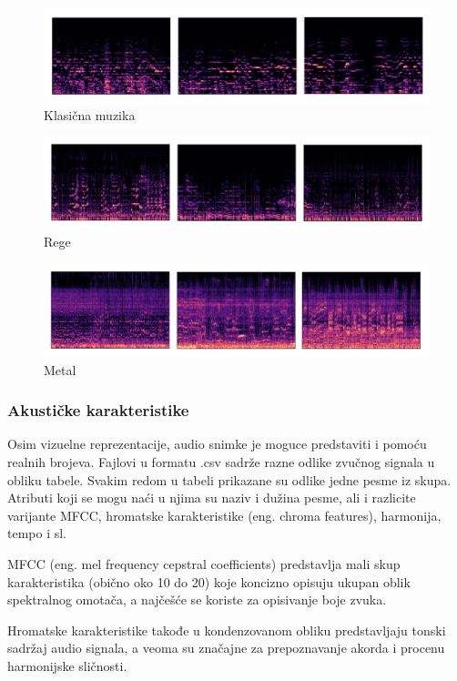 \documentclass{article}
\begin{document}
\begin{figure}[t]
\centering
\includegraphics[scale=0.65]{classical}
\caption{Klasična muzika}
\end{figure}
\begin{figure}[t]
\centering
\includegraphics[scale=0.65]{reggae}
\caption{Rege}
\end{figure}
\begin{figure}[h]
\centering
\includegraphics[scale=0.65]{metal}
\caption{Metal}
\end{figure}


\subsubsection{Akustičke karakteristike}

Osim vizuelne reprezentacije, audio snimke je moguce predstaviti i pomoću realnih brojeva. Fajlovi u formatu .csv sadrže razne odlike zvučnog signala u obliku tabele. Svakim redom u tabeli prikazane su odlike jedne pesme iz skupa. Atributi koji se mogu naći u njima su naziv i dužina pesme, ali i razlicite varijante MFCC, hromatske karakteristike (eng. chroma features), harmonija, tempo i sl. 

MFCC (eng. mel frequency cepstral coefficients) predstavlja mali skup karakteristika (obično oko 10 do 20) koje koncizno opisuju ukupan oblik spektralnog omotača, a najčešće se koriste za opisivanje boje zvuka.

Hromatske karakteristike takođe u kondenzovanom obliku predstavljaju tonski sadržaj audio signala, a veoma su značajne za prepoznavanje akorda i procenu harmonijske sličnosti.
\end{document}
